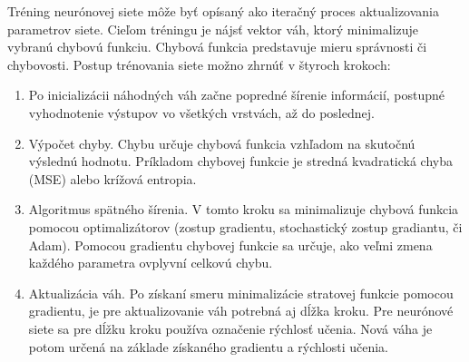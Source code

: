 Tréning neurónovej siete môže byť opísaný ako iteračný proces aktualizovania parametrov siete. Cieľom tréningu je nájsť vektor váh, ktorý minimalizuje vybranú chybovú funkciu. Chybová funkcia predstavuje mieru správnosti či chybovosti. Postup trénovania siete možno zhrnúť v štyroch krokoch: 
\begin{enumerate}[label=\arabic*.]
	\item Po inicializácii náhodných váh začne popredné šírenie informácií, postupné vyhodnotenie výstupov vo všetkých vrstvách, až do poslednej. 
	\item Výpočet chyby. Chybu určuje chybová funkcia vzhľadom na skutočnú výslednú hodnotu. Príkladom chybovej funkcie je stredná kvadratická chyba (MSE) alebo krížová entropia.
	\item Algoritmus spätného šírenia. V tomto kroku sa minimalizuje chybová funkcia pomocou optimalizátorov (zostup gradientu, stochastický zostup gradiantu, či Adam).
	  Pomocou gradientu chybovej funkcie sa určuje, ako veľmi zmena každého parametra ovplyvní celkovú chybu.
	\item Aktualizácia váh. Po získaní smeru minimalizácie stratovej funkcie pomocou gradientu, je pre aktualizovanie váh potrebná aj dĺžka kroku. Pre neurónové siete sa pre dĺžku kroku používa označenie rýchlosť učenia. Nová váha je potom určená na základe získaného gradientu a rýchlosti učenia.
\end{enumerate}

